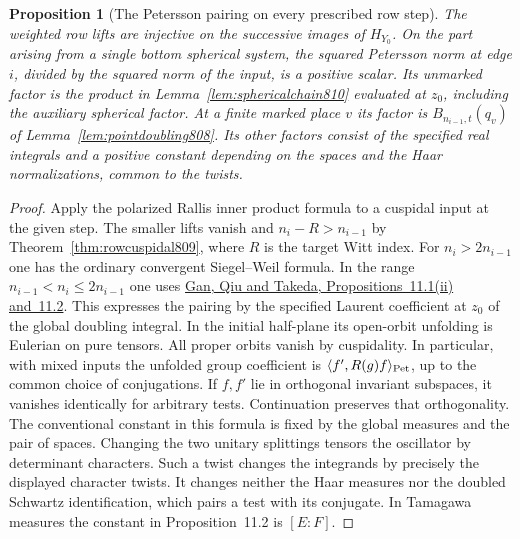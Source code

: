 \documentclass[a4paper,11pt]{article}
\newtheorem{proposition}{Proposition}[section]
\theoremstyle{definition}
\theoremstyle{remark}
\numberwithin{equation}{section}
\begin{document}
\begin{proposition}[The Petersson pairing on every prescribed row step]
\leavevmode\label{prop:chainpairing810}
The weighted row lifts are injective on the successive images of
\(H_{Y_0}\). On the part arising from a single bottom spherical
system, the squared Petersson norm at edge \(i\), divided by the
squared norm of the input, is a positive scalar. Its unmarked
factor is the product in Lemma~\ref{lem:sphericalchain810}
evaluated at \(z_0\), including the auxiliary spherical factor.
At a finite marked place \(v\) its factor is \(B_{n_{i-1},t}(q_v)\)
of Lemma~\ref{lem:pointdoubling808}. Its other factors consist of
the specified real integrals and a positive constant depending on
the spaces and the Haar normalizations, common to the twists.
\end{proposition}
\begin{proof}
Apply the polarized Rallis inner product formula to a cuspidal
input at the given step. The smaller lifts vanish and \(n_i-R>
n_{i-1}\) by Theorem~\ref{thm:rowcuspidal809}, where \(R\) is
the target Witt index. For \(n_i>2n_{i-1}\) one has the ordinary
convergent Siegel--Weil formula. In the range
\(n_{i-1}<n_i\leq2n_{i-1}\) one uses
\href{https://arxiv.org/pdf/1207.4709}{Gan, Qiu and Takeda,
Propositions~11.1(ii) and~11.2}. This expresses the pairing
by the specified Laurent coefficient at \(z_0\) of the
global doubling integral. In the initial half-plane its
open-orbit unfolding is Eulerian on pure tensors. All proper
orbits vanish by cuspidality. In particular, with mixed inputs
the unfolded group coefficient is
\(\langle f',R(g)f\rangle_{\rm Pet}\), up to the common choice
of conjugations. If \(f,f'\) lie in orthogonal invariant
subspaces, it vanishes identically for arbitrary tests.
Continuation preserves that orthogonality. The conventional
constant in this formula is fixed by the global measures and
the pair of spaces. Changing the two unitary splittings
tensors the oscillator by determinant characters. Such a
twist changes the integrands by precisely the displayed
character twists. It changes neither the Haar measures nor
the doubled Schwartz identification, which pairs a test
with its conjugate. In Tamagawa measures the constant in
Proposition~11.2 is \([E:F]\).


\end{proof}
\end{document}
